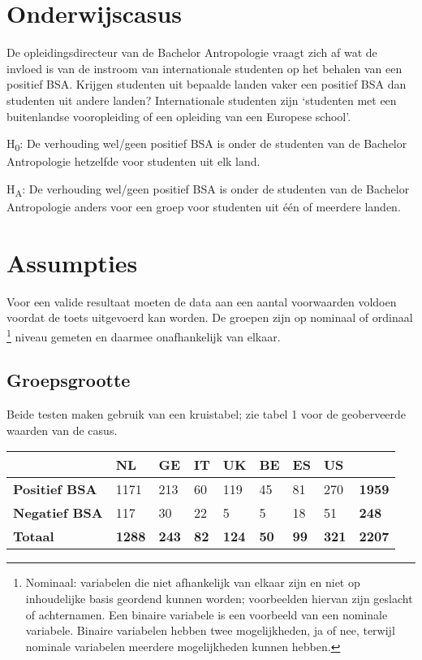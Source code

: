 \documentclass[
]{article}
\begin{document}
\hypertarget{onderwijscasus}{%
\section{Onderwijscasus}\label{onderwijscasus}}

\leavevmode\hypertarget{casus}{}%
De opleidingsdirecteur van de Bachelor Antropologie vraagt zich af wat
de invloed is van de instroom van internationale studenten op het
behalen van een positief BSA. Krijgen studenten uit bepaalde landen
vaker een positief BSA dan studenten uit andere landen? Internationale
studenten zijn `studenten met een buitenlandse vooropleiding of een
opleiding van een Europese school'.

H\textsubscript{0}: De verhouding wel/geen positief BSA is onder de
studenten van de Bachelor Antropologie hetzelfde voor studenten uit elk
land.

H\textsubscript{A}: De verhouding wel/geen positief BSA is onder de
studenten van de Bachelor Antropologie anders voor een groep voor
studenten uit één of meerdere landen.

\hypertarget{assumpties}{%
\section{Assumpties}\label{assumpties}}

Voor een valide resultaat moeten de data aan een aantal voorwaarden
voldoen voordat de toets uitgevoerd kan worden. De groepen zijn op
nominaal of ordinaal \footnote{Nominaal: variabelen die niet afhankelijk
  van elkaar zijn en niet op inhoudelijke basis geordend kunnen worden;
  voorbeelden hiervan zijn geslacht of achternamen. Een binaire
  variabele is een voorbeeld van een nominale variabele. Binaire
  variabelen hebben twee mogelijkheden, ja of nee, terwijl nominale
  variabelen meerdere mogelijkheden kunnen hebben.} niveau gemeten en
daarmee onafhankelijk van elkaar.

\hypertarget{groepsgrootte}{%
\subsection{Groepsgrootte}\label{groepsgrootte}}

Beide testen maken gebruik van een kruistabel; zie tabel 1 voor de
geoberveerde waarden van de casus.

\begin{longtable}[]{@{}lllllllll@{}}
\toprule
& NL & GE & IT & UK & BE & ES & US &\tabularnewline
\midrule
\endhead
\textbf{Positief BSA} & 1171 & 213 & 60 & 119 & 45 & 81 & 270 &
\textbf{1959}\tabularnewline
\textbf{Negatief BSA} & 117 & 30 & 22 & 5 & 5 & 18 & 51 &
\textbf{248}\tabularnewline
\textbf{Totaal} & \textbf{1288} & \textbf{243} & \textbf{82} &
\textbf{124} & \textbf{50} & \textbf{99} & \textbf{321} &
\textbf{2207}\tabularnewline
\bottomrule
\end{longtable}
\end{document}
